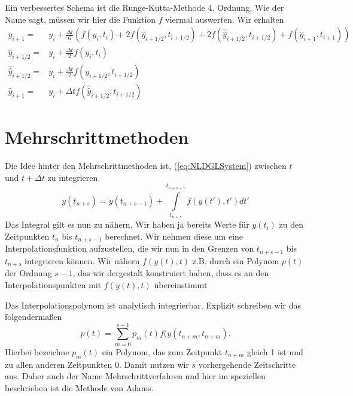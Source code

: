 Ein verbessertes Schema ist die Runge-Kutta-Methode 4. Ordnung. Wie der Name
sagt, müssen wir hier die  Funktion $f$ viermal auswerten. Wir erhalten
\begin{align}\label{eq:RK4order}
  y_{i+1} =& y_{i}+\frac{\Delta t}{6}\left( 
    f(y_i,t_i)+2f(\hat{y}_{i+1/2},t_{i+1/2})+2f(\hat{\hat{y}}_{i+1/2},t_{i+1/2})
  +f(\hat{y}_{i+1},t_{i+1})\right)\\
  \hat{y}_{i+1/2}=&y_i+\frac{\Delta t}{2}f(y_{i},t_{i})\nonumber\\
  \hat{\hat{y}}_{i+1/2}=&y_i+\frac{\Delta t}{2}f(y_{i+1/2},t_{i+1/2})\nonumber\\
  \hat{y}_{i+1}=&y_i+\Delta tf(\hat{\hat{y}}_{i+1/2},t_{i+1/2})\nonumber
\end{align}

\section{Mehrschrittmethoden}
Die Idee hinter den Mehrschrittmethoden ist, (\ref{eq:NLDGLSystem}) zwischen
$t$ und $t+\Delta t$ zu integrieren
\begin{equation*}
y(t_{n+s})=y(t_{n+s-1})+\int\limits_{t_{n+s}}^{t_{n+s-1}}f(y(t'),t')dt'
\end{equation*}
Das Integral gilt es nun zu nähern. Wir haben ja bereits Werte für $y(t_i)$ zu
den Zeitpunkten $t_n$  bis $t_{n+s-1}$ berechnet. Wir nehmen  diese um eine
Interpolationsfunktion aufzustellen, die wir nun in den Grenzen von $t_{n+s-1}$
bis $t_{n+s}$ integrieren können. Wir nähern $f(y(t),t)$ z.B. durch ein
Polynom $p(t)$ der Ordnung $s-1$, das wir dergestalt konstruiert haben, dass es an
den Interpolationspunkten mit $f(y(t),t)$ übereinstimmt

Das Interpolationspolynom ist analytisch integrierbar.  Explizit schreiben wir
das folgendermaßen
\[ p(t)=\sum\limits_{m=0}^{s-1}p_m(t)f(y(t_{n+m},t_{n+m}). \]
Hierbei bezeichne $p_m(t)$ ein Polynom, das zum Zeitpunkt $t_{n+m}$ gleich 1
ist und zu allen anderen Zeitpunkten 0. Damit nutzen wir $s$ vorhergehende
Zeitschritte aus. Daher auch der Name Mehrschrittverfahren und hier im
speziellen beschrieben ist die Methode von Adams.
